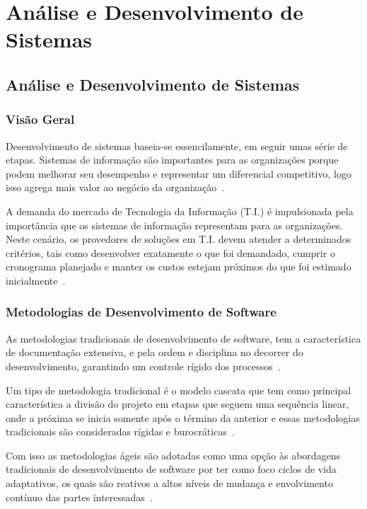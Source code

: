 \part{Análise e Desenvolvimento de Sistemas}\label{ParteII}

\chapter[Análise e Desenvolvimento de Sistemas]{Análise e Desenvolvimento de Sistemas}\label{Capitulo3}

\section{Visão Geral}

Desenvolvimento de sistemas baseia-se essencilamente, em seguir umas série de etapas.
Sistemas de informação são importantes para as organizações porque podem melhorar seu desempenho e representar um diferencial competitivo, logo isso agrega mais valor ao negócio da organização~\cite{alvarenga2016efeitos}.

A demanda do mercado de Tecnologia da Informação (T.I.) é impulsionada pela importância que os sistemas de informação representam para as organizações.
Neste cenário, os provedores de soluções em T.I. devem atender a determinados critérios, tais como desenvolver exatamente o que foi demandado, cumprir o cronograma planejado e manter os custos estejam próximos do que foi estimado inicialmente~\cite{alvarenga2016efeitos}.

\section{Metodologias de Desenvolvimento de Software}

As metodologias tradicionais de desenvolvimento de software, tem a característica de documentação extensiva, e pela ordem e disciplina no decorrer do desenvolvimento, garantindo um controle rígido dos processos~\cite{baltzan2016tecnologia}.

Um tipo de metodologia tradicional é o modelo cascata que tem como principal característica a divisão do projeto em etapas que seguem uma sequência linear, onde a próxima se inicia somente após o término da anterior e essas metodologias tradicionais são consideradas rígidas e burocráticas~\cite{baltzan2016tecnologia}.

Com isso as metodologias ágeis são adotadas como uma opção às abordagens tradicionais de desenvolvimento de software por ter como foco ciclos de vida adaptativos, os quais são reativos a altos níveis de mudança e envolvimento contínuo das partes interessadas~\cite{vargas2014manual}.

